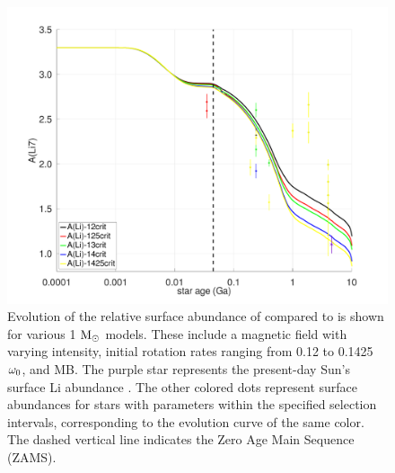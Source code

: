 \documentclass[fleqn,usenatbib]{mnras}
\begin{document}
\begin{figure}
	\includegraphics[clip,width=\columnwidth]{figures/paper2/li_var_vel_var_g_3.pdf}
    \caption{Evolution of the relative surface abundance of  compared to  is shown for various 1 $\mathrm{M}_\odot$ models. These include a magnetic field with varying intensity, initial rotation rates ranging from 0.12 to 0.1425 $\omega_{\mathrm{0}}$, and MB. The purple star represents the present-day Sun's surface Li abundance \citep{Asplund2009}. The other colored dots represent surface  abundances for stars with parameters within the specified selection intervals, corresponding to the evolution curve of the same color. The dashed vertical line indicates the Zero Age Main Sequence (ZAMS).}
    \label{fig:li_var_vel_var_g_3}
\end{figure}
\end{document}
